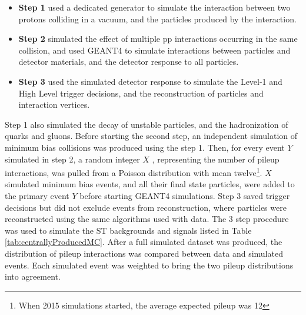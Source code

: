 \begin{itemize}
	\item \textbf{Step 1} used a dedicated \MC generator to simulate the interaction between two protons 
		colliding in a vacuum, and the particles produced by the interaction.
	\item \textbf{Step 2} simulated the effect of multiple pp interactions occurring in the same collision, 
		and used GEANT4 \cite{geant4} to simulate interactions between particles and detector materials, 
		and the detector response to all particles.
	\item \textbf{Step 3} used the simulated detector response to simulate the Level-1 and High Level 
		trigger decisions, and the reconstruction of particles and interaction vertices.
\end{itemize}

Step 1 also simulated the decay of unstable particles, and the hadronization of quarks and gluons.  
Before starting the second step, an independent \MC simulation of minimum bias collisions was produced 
using the step 1.  Then, for every event $Y$ simulated in step 2, a random integer $X$ 
, representing the number of pileup interactions, was pulled from a Poisson distribution with mean twelve\footnote{When 2015 \MC simulations started, the 
average expected pileup was 12}.  $X$ simulated minimum bias events, and all 
their final state particles, were added to the primary event $Y$ before starting GEANT4 simulations.  Step 
3 saved trigger decisions but did not exclude events from reconstruction, where particles were 
reconstructed using the same algorithms used with data.  The 3 step procedure 
was used to simulate the ST backgrounds and \WR signals listed in Table \ref{tab:centrallyProducedMC}.  After 
a full simulated dataset was produced, the distribution of pileup interactions was compared between data 
and simulated events.  Each simulated event was weighted to bring the two pileup distributions into agreement.

